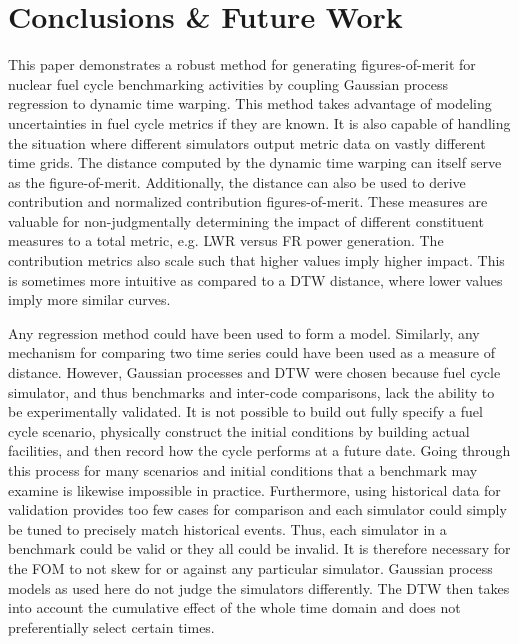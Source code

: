 \section{Conclusions \& Future Work}
\label{conclusion}

This paper demonstrates a robust method for generating figures-of-merit
for nuclear fuel cycle benchmarking activities by coupling Gaussian process
regression to dynamic time warping. This method takes advantage of modeling
uncertainties in fuel cycle metrics if they are known. It is also capable 
of handling the situation where different simulators output metric data on
vastly different time grids. The distance computed by the dynamic time 
warping can itself serve as the figure-of-merit. Additionally, the 
distance can also be used to derive contribution and normalized contribution
figures-of-merit. These measures are valuable for non-judgmentally 
determining the impact of different constituent measures to a total 
metric, e.g. LWR versus FR power generation. The contribution metrics also 
scale such that higher values imply higher impact. This is sometimes
more intuitive as compared to a DTW distance, where lower values imply
more similar curves.

Any regression method could have been used to form a model. Similarly, any
mechanism for comparing two time series could have been used as a measure
of distance.  However, Gaussian processes and DTW were chosen because
fuel cycle simulator, and thus benchmarks and inter-code comparisons, lack 
the ability to be experimentally validated.
It is not possible to build out fully specify a fuel cycle scenario,
physically construct the initial conditions by building actual facilities, 
and then record how the cycle performs at a future date. 
Going through this process for many scenarios and initial conditions that 
a benchmark may examine is likewise impossible in practice.
Furthermore, using 
historical data for validation provides too few cases for comparison and 
each simulator could simply be tuned to precisely match historical events.
Thus, each simulator in a benchmark could be valid or they all could be 
invalid. It is therefore necessary for the FOM to not skew for or against 
any particular simulator. Gaussian process models as used here do not 
judge the simulators differently. The DTW then takes into account the 
cumulative effect of the whole time domain and does not preferentially 
select certain times.

